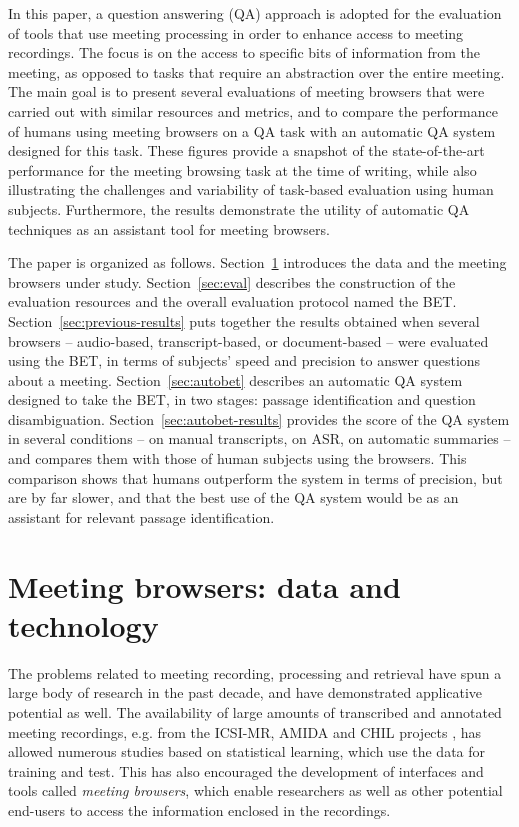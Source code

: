 \documentclass[11pt]{article}
\begin{document}
In this paper, a question answering (QA) approach is adopted for the evaluation of tools that use meeting processing in order to enhance access to meeting recordings.  The focus is on the access to specific bits of information from the meeting, as opposed to tasks that require an abstraction over the entire meeting.  The main goal is to present several evaluations of meeting browsers that were carried out with similar resources and metrics, and to compare the performance of humans using meeting browsers on a QA task with an automatic QA system designed for this task.  These figures provide a snapshot of the state-of-the-art performance for the meeting browsing task at the time of writing, while also illustrating the challenges and variability of task-based evaluation using human subjects.  Furthermore, the results demonstrate the utility of automatic QA techniques as an assistant tool for meeting browsers.

The paper is organized as follows.  Section~\ref{sec:browsers} introduces the data and the meeting browsers under study. Section~\ref{sec:eval} describes the construction of the evaluation resources and the overall evaluation protocol named the BET.  Section~\ref{sec:previous-results} puts together the results obtained when several browsers -- audio-based, transcript-based, or document-based -- were evaluated using the BET, in terms of subjects' speed and precision to answer questions about a meeting.  Section~\ref{sec:autobet} describes an automatic QA system designed to take the BET, in two stages: passage identification and question disambiguation.  Section~\ref{sec:autobet-results} provides the score of the QA system in several conditions -- on manual transcripts, on ASR, on automatic summaries -- and compares them with those of human subjects using the browsers.  This comparison shows that humans outperform the system in terms of precision, but are by far slower, and that the best use of the QA system would be as an assistant for relevant passage identification.


\section{Meeting browsers: data and technology}
\label{sec:browsers}

The problems related to meeting recording, processing and retrieval have spun a large body of research in the past decade, and have demonstrated applicative potential as well.  The availability of large amounts of transcribed and annotated meeting recordings, e.g. from the ICSI-MR, AMIDA and CHIL projects \cite{Janin2003,car06,Mostefa2007}, has allowed numerous studies based on statistical learning, which use the data for training and test.  This has also encouraged the development of interfaces and tools called \textit{meeting browsers}, which enable researchers as well as other potential end-users to access the information enclosed in the recordings.  
\end{document}
